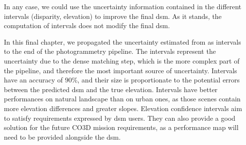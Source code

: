 In any case, we could use the uncertainty information contained in the different intervals (disparity, elevation) to improve the final \acrshort{dsm}. As it stands, the computation of intervals does not modify the final \acrshort{dsm}.

In this final chapter, we propagated the uncertainty estimated from  as intervals to the end of the photogrammetry pipeline. The intervals represent the uncertainty due to the dense matching step, which is the more complex part of the pipeline, and therefore the most important source of uncertainty. Intervals have an accuracy of $90\%$, and their size is proportionate to the potential errors between the predicted \acrshort{dsm} and the true elevation. Intervals have better performances on natural landscape than on urban ones, as those scenes contain more elevation differences and greater slopes. Elevation confidence intervals aim to satisfy requirements expressed by \acrshort{dsm} users. They can also provide a good solution for the future CO3D mission requirements, as a performance map will need to be provided alongside the \acrshort{dsm}.

\pagebreak
\blankpage